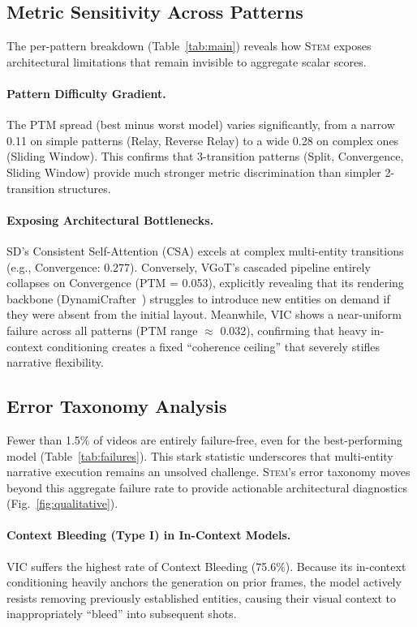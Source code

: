 \documentclass[sigconf,review,anonymous]{acmart}
\theoremstyle{definition}
\newcommand{\stem}{\textsc{Stem}}
\begin{document}
\subsection{Metric Sensitivity Across Patterns}
\label{sec:pattern_analysis}

The per-pattern breakdown (Table~\ref{tab:main}) reveals how \stem{} exposes architectural limitations that remain invisible to aggregate scalar scores.

\paragraph{Pattern Difficulty Gradient.}
The PTM spread (best minus worst model) varies significantly, from a narrow 0.11 on simple patterns (Relay, Reverse Relay) to a wide 0.28 on complex ones (Sliding Window). This confirms that 3-transition patterns (Split, Convergence, Sliding Window) provide much stronger metric discrimination than simpler 2-transition structures.

\paragraph{Exposing Architectural Bottlenecks.}
SD's Consistent Self-Attention (CSA) excels at complex multi-entity transitions (e.g., Convergence: 0.277). Conversely, VGoT's cascaded pipeline entirely collapses on Convergence (PTM = 0.053), explicitly revealing that its rendering backbone (DynamiCrafter~\cite{dynamicrafter}) struggles to introduce new entities on demand if they were absent from the initial layout. Meanwhile, VIC shows a near-uniform failure across all patterns (PTM range $\approx$ 0.032), confirming that heavy in-context conditioning creates a fixed ``coherence ceiling'' that severely stifles narrative flexibility.

\subsection{Error Taxonomy Analysis}
\label{sec:failure_analysis}

Fewer than 1.5\% of videos are entirely failure-free, even for the best-performing model (Table~\ref{tab:failures}). This stark statistic underscores that multi-entity narrative execution remains an unsolved challenge. \stem{}'s error taxonomy moves beyond this aggregate failure rate to provide actionable architectural diagnostics (Fig.~\ref{fig:qualitative}).

\paragraph{Context Bleeding (Type I) in In-Context Models.}
VIC suffers the highest rate of Context Bleeding (75.6\%). Because its in-context conditioning heavily anchors the generation on prior frames, the model actively resists removing previously established entities, causing their visual context to inappropriately ``bleed'' into subsequent shots.
\end{document}
